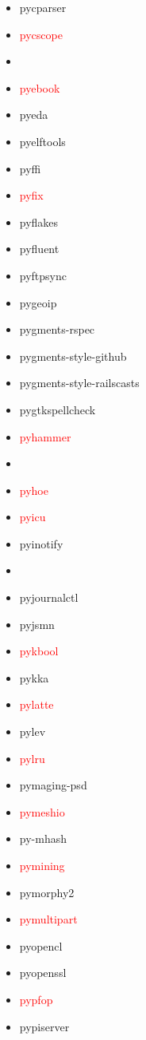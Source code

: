 \documentclass{l4proj}
\begin{document}
\begin{appendices}
{\begin{itemize}
\item pycparser
\item\textcolor{red}{pycscope}
\item {}
\item\textcolor{red}{pyebook}
\item pyeda
\item pyelftools
\item pyffi
\item\textcolor{red}{pyfix}
\item pyflakes
\item pyfluent
\item pyftpsync
\item pygeoip
\item pygments-rspec
\item pygments-style-github
\item pygments-style-railscasts
\item pygtkspellcheck
\item\textcolor{red}{pyhammer}
\item\textcolor{red}{}
\item\textcolor{red}{pyhoe}
\item\textcolor{red}{pyicu}
\item pyinotify
\item\textcolor{red}{}
\item pyjournalctl
\item pyjsmn
\end{itemize}
}%
\clearpage
\noindent\parbox[t]{0.32\textwidth}{\raggedright%
\begin{itemize}
\item\textcolor{red}{pykbool}
\item pykka
\item\textcolor{red}{pylatte}
\item pylev
\item\textcolor{red}{pylru}
\item pymaging-psd
\item\textcolor{red}{pymeshio}
\item py-mhash
\item\textcolor{red}{pymining}
\item pymorphy2
\item\textcolor{red}{pymultipart}
\item pyopencl
\item pyopenssl
\item\textcolor{red}{pypfop}
\item pypiserver

\end{itemize}}
\end{appendices}
\end{document}
